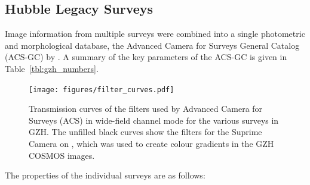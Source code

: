 \documentclass[a4paper,fleqn,usenatbib]{mnras}
\begin{document}
\subsection{Hubble Legacy Surveys}\label{ssec:legacy_surveys}

Image information from
multiple \hst{} surveys were combined into a single photometric and
morphological database, the Advanced Camera for Surveys General Catalog (ACS-GC) by 
\citet{gri12}. A summary of the key parameters of the ACS-GC is given in
Table~\ref{tbl:gzh_numbers}. 


\begin{figure}
\texttt{[image: figures/filter\_curves.pdf]}
\caption{Transmission curves of the filters used by \hst{} Advanced Camera for
Surveys (ACS) in wide-field channel mode for the various surveys in GZH. The
unfilled black curves show the filters for the Suprime Camera on \subaru, which
was used to create colour gradients in the GZH COSMOS
images.}
\label{fig:filtercurves}
\end{figure}

The properties of the individual surveys are as follows:
\end{document}
